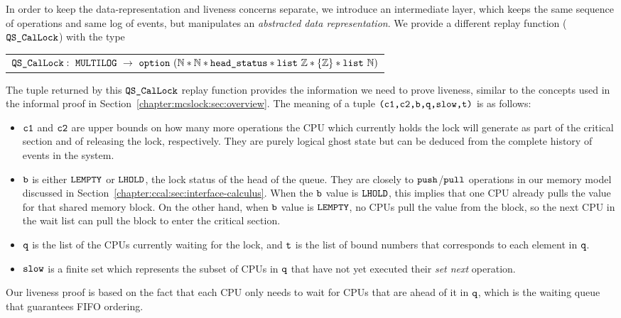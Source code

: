In order to keep the data-representation and liveness concerns separate,
we introduce an intermediate layer, which keeps the same sequence of operations and same log of events, 
but manipulates an \emph{abstracted data representation}.
We provide a different replay function (${\mathrm{\texttt{QS\_CalLock}}}$) with the type \newline
\begin{tabular}{P{0.95\textwidth}}
$\QSCalLock :\ \lockmultilog\ \rightarrow\ \optiondef\ (\nattype * \nattype * \codeinmath{head\_status} * \codeinmath{list} \ \ztype *  \set{\ztype} * \codeinmath{list} \ \nattype)$\\
\end{tabular}\newline
The tuple returned by this ${\mathrm{\texttt{QS\_CalLock}}}$ replay function provides the information we
need to prove liveness, 
similar to the concepts used in the informal
proof in Section~\ref{chapter:mcslock:sec:overview}. 
The meaning of a tuple ${\mathrm{\texttt{(c1,c2,b,q,slow,t)}}}$ is as follows:
\begin{itemize}
\item  ${\mathrm{\texttt{c1}}}$ and ${\mathrm{\texttt{c2}}}$ are upper bounds on how many more operations 
the CPU which currently holds the lock will generate as part of the critical section and of 
releasing the lock, respectively. They are purely logical ghost state but can be deduced from the complete
history of events in the system.

\item ${\mathrm{\texttt{b}}}$ is either  ${\mathrm{\texttt{LEMPTY}}}$ or  ${\mathrm{\texttt{LHOLD}}}$, 
the lock status of the head of the queue.
They are closely to ${\mathrm{\texttt{push}}}$/${\mathrm{\texttt{pull}}}$ operations in our memory model discussed in Section~\ref{chapter:ccal:sec:interface-calculus}.
When the ${\mathrm{\texttt{b}}}$ value is ${\mathrm{\texttt{LHOLD}}}$, this implies that one CPU already pulls the value for that shared memory block.
On the other hand, when ${\mathrm{\texttt{b}}}$ value is ${\mathrm{\texttt{LEMPTY}}}$, no CPUs pull the value from the block, so the next CPU in the wait list 
can pull the block to enter the critical section.

\item ${\mathrm{\texttt{q}}}$ is the list of the CPUs currently waiting for the lock, 
and ${\mathrm{\texttt{t}}}$ is the list of bound numbers that 
corresponds to each element in ${\mathrm{\texttt{q}}}$.

\item ${\mathrm{\texttt{slow}}}$ is a finite set which represents the subset of CPUs in ${\mathrm{\texttt{q}}}$ that have not yet executed their \emph{set next} operation.  
\end{itemize}
Our liveness proof is based on the fact that each CPU only needs to wait for CPUs that are ahead of it in ${\mathrm{\texttt{q}}}$, which is the waiting queue that guarantees FIFO ordering.


